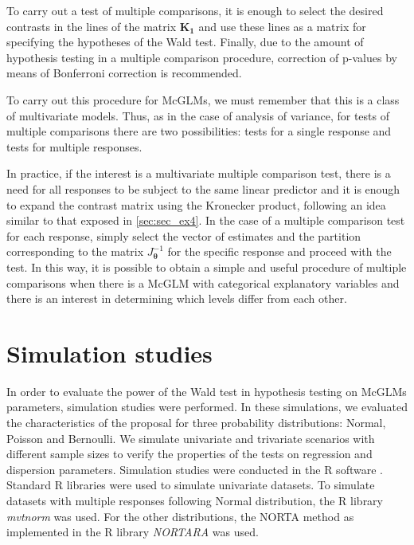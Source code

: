 \documentclass[Review,sagev,times, doublespace]{sagej}
\begin{document}
To carry out a test of multiple comparisons, it is enough to select the desired contrasts in the lines of the matrix $\boldsymbol{K_1}$ and use these lines as a matrix for specifying the hypotheses of the Wald test. Finally, due to the amount of hypothesis testing in a multiple comparison procedure, correction of p-values by means of Bonferroni correction is recommended.

To carry out this procedure for McGLMs, we must remember that this is a class of multivariate models. Thus, as in the case of analysis of variance, for tests of multiple comparisons there are two possibilities: tests for a single response and tests for multiple responses. 

In practice, if the interest is a multivariate multiple comparison test, there is a need for all responses to be subject to the same linear predictor and it is enough to expand the contrast matrix using the Kronecker product, following an idea similar to that exposed in \autoref{sec:sec_ex4}. In the case of a multiple comparison test for each response, simply select the vector of estimates and the partition corresponding to the matrix  $J_{\boldsymbol{\theta}}^{-1}$ for the specific response and proceed with the test. In this way, it is possible to obtain a simple and useful procedure of multiple comparisons when there is a McGLM with categorical explanatory variables and there is an interest in determining which levels differ from each other.


\section{Simulation studies}\label{sec5}

In order to evaluate the power of the Wald test in hypothesis testing on McGLMs parameters, simulation studies were performed. In these simulations, we evaluated the characteristics of the proposal for three probability distributions: Normal, Poisson and Bernoulli. We simulate univariate and trivariate scenarios with different sample sizes to verify the properties of the tests on regression and dispersion parameters. Simulation studies were conducted in the R software \cite{R}. Standard R libraries were used to simulate univariate datasets. To simulate datasets with multiple responses following Normal distribution, the R library \emph{mvtnorm} \cite{mvtnorm1} \cite{mvtnorm2} was used. For the other distributions, the NORTA \cite{norta} method as implemented in the R library \emph{NORTARA} \cite{nortara} was used.
\end{document}
